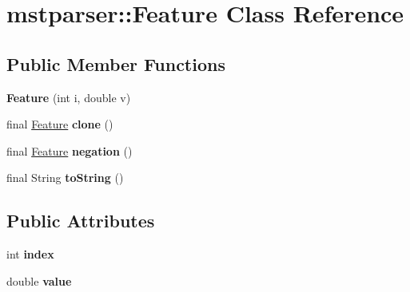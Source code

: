\hypertarget{classmstparser_1_1Feature}{
\section{mstparser::Feature Class Reference}
\label{classmstparser_1_1Feature}
}
\subsection*{Public Member Functions}
\begin{DoxyCompactItemize}
\item 
\hypertarget{classmstparser_1_1Feature_a5c445cf0f3cdfadd99a17b4db030b1f1}{
{\bfseries Feature} (int i, double v)}
\label{classmstparser_1_1Feature_a5c445cf0f3cdfadd99a17b4db030b1f1}

\item 
\hypertarget{classmstparser_1_1Feature_acacd3d0c4a2b4dda3a516146a30c7a07}{
final \hyperlink{classmstparser_1_1Feature}{Feature} {\bfseries clone} ()}
\label{classmstparser_1_1Feature_acacd3d0c4a2b4dda3a516146a30c7a07}

\item 
\hypertarget{classmstparser_1_1Feature_a6296b249dc1a02defd359bd16d7c78a6}{
final \hyperlink{classmstparser_1_1Feature}{Feature} {\bfseries negation} ()}
\label{classmstparser_1_1Feature_a6296b249dc1a02defd359bd16d7c78a6}

\item 
\hypertarget{classmstparser_1_1Feature_a8a21c64d94814df4f244511fc4553b12}{
final String {\bfseries toString} ()}
\label{classmstparser_1_1Feature_a8a21c64d94814df4f244511fc4553b12}

\end{DoxyCompactItemize}
\subsection*{Public Attributes}
\begin{DoxyCompactItemize}
\item 
\hypertarget{classmstparser_1_1Feature_a4c473e4481d5556f4566749d3a9142ce}{
int {\bfseries index}}
\label{classmstparser_1_1Feature_a4c473e4481d5556f4566749d3a9142ce}

\item 
\hypertarget{classmstparser_1_1Feature_a4b6105d258e0f09324f2d9648804417a}{
double {\bfseries value}}
\label{classmstparser_1_1Feature_a4b6105d258e0f09324f2d9648804417a}

\end{DoxyCompactItemize}


